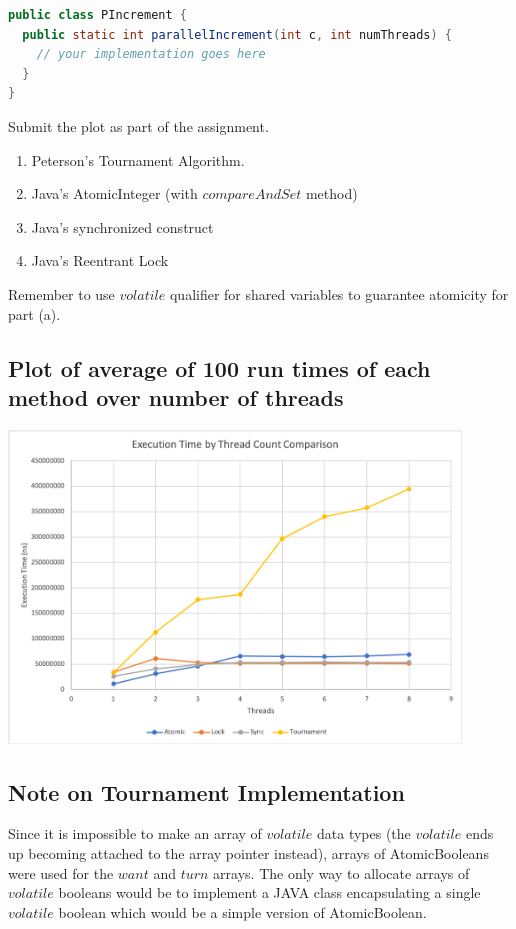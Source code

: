 \documentclass{article}
\begin{document}
\begin{lstlisting}[language=Java]
public class PIncrement {
  public static int parallelIncrement(int c, int numThreads) {
    // your implementation goes here
  }
}
\end{lstlisting}


Submit the plot as part of the assignment.

\begin{enumerate}[label=\alph*)]
  \item Peterson’s Tournament Algorithm.
  \item Java’s AtomicInteger (with $compareAndSet$ method)
  \item Java’s synchronized construct
  \item Java’s Reentrant Lock
\end{enumerate}

Remember to use $volatile$ qualifier for shared variables to guarantee
atomicity for part (a).

\subsection{Plot of average of 100 run times of each method over number of threads}
\includegraphics[width=12cm]{aggregate}

\subsection{Note on Tournament Implementation}
Since it is impossible to make an array of $volatile$ data types (the $volatile$ ends up becoming attached to the array pointer instead), arrays of AtomicBooleans were used for the $want$ and $turn$ arrays. The only way to allocate arrays of $volatile$ booleans would be to implement a JAVA class encapsulating a single $volatile$ boolean which would be a simple version of AtomicBoolean.
\end{document}
